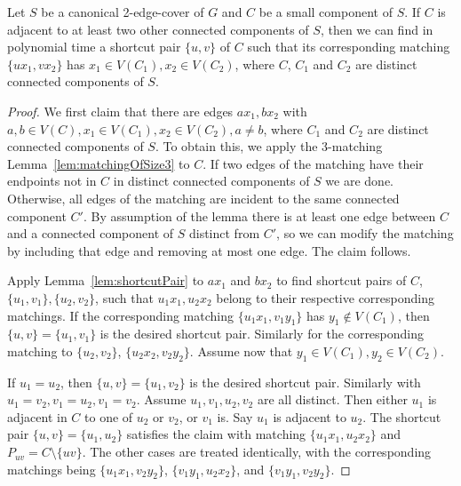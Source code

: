\documentclass{theoretics}
\begin{document}
\begin{corollary}\label{cor:shortcutPair}
    Let $S$ be a canonical 2-edge-cover of $G$ and $C$ be a small component of $S$. If $C$ is adjacent to at least two other connected components of $S$, then we can find in polynomial time a shortcut pair $\{u, v\}$ of $C$ such that its corresponding matching $\{ux_1, vx_2\}$ has $x_1\in V(C_1), x_2\in V(C_2)$, where $C$, $C_1$ and $C_2$ are distinct connected components of $S$.
\end{corollary}
\begin{proof}
    We first claim that there are edges $ax_1, bx_2$ with $a, b\in V(C), x_1\in V(C_1), x_2\in V(C_2), a\neq b$, where $C_1$ and $C_2$ are distinct connected components of $S$. To obtain this, we apply the 3-matching Lemma~\ref{lem:matchingOfSize3} to $C$. If two edges of the matching have their endpoints not in $C$ in distinct connected components of $S$ we are done. Otherwise, all edges of the matching are incident to the same connected component $C'$. By assumption of the lemma there is at least one edge between $C$ and a connected component of $S$ distinct from $C'$, so we can modify the matching by including that edge and removing at most one edge. The claim follows. 
    
    Apply Lemma~\ref{lem:shortcutPair} to $ax_1$ and $bx_2$ to find shortcut pairs of $C$, $\{u_1, v_1\}, \{u_2, v_2\}$, such that $u_1x_1, u_2x_2$ belong to their respective corresponding matchings. If the corresponding matching $\{u_1x_1, v_1y_1\}$ has $y_1\notin V(C_1)$, then $\{u, v\}=\{u_1, v_1\}$ is the desired shortcut pair. Similarly for the corresponding matching to $\{u_2, v_2\}$, $\{u_2x_2, v_2y_2\}$. Assume now that $y_1\in V(C_1), y_2\in V(C_2)$.
    
    If $u_1=u_2$, then $\{u, v\}=\{u_1, v_2\}$ is the desired shortcut pair. Similarly with $u_1=v_2, v_1=u_2, v_1=v_2$. Assume $u_1, v_1, u_2, v_2$ are all distinct. Then either $u_1$ is adjacent in $C$ to one of $u_2$ or $v_2$, or $v_1$ is. Say $u_1$ is adjacent to $u_2$. The shortcut pair $\{u, v\}=\{u_1, u_2\}$ satisfies the claim with matching $\{u_1x_1, u_2x_2\}$ and $P_{uv}=C\setminus\{uv\}$. The other cases are treated identically, with the corresponding matchings being $\{u_1x_1, v_2y_2\}$, $\{v_1y_1, u_2x_2\}$, and $\{v_1y_1, v_2y_2\}$.
\end{proof}
\setcounter{AlgoLine}{0}
\end{document}

